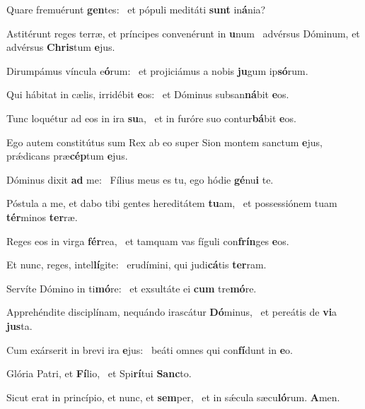 \item Quare fremuérunt \textbf{gen}tes:~\psstar{} et pópuli meditáti \textbf{sunt} in\textbf{á}nia?
\item Astitérunt reges terræ, et príncipes convenérunt in \textbf{u}num~\psstar{} advérsus Dóminum, et advérsus \textbf{Chris}tum \textbf{e}jus.
\item Dirumpámus víncula e\textbf{ó}rum:~\psstar{} et projiciámus a nobis \textbf{ju}gum ip\textbf{só}rum.
\item Qui hábitat in cælis, irridébit \textbf{e}os:~\psstar{} et Dóminus subsan\textbf{ná}bit \textbf{e}os.
\item Tunc loquétur ad eos in ira \textbf{su}a,~\psstar{} et in furóre suo contur\textbf{bá}bit \textbf{e}os.
\item Ego autem constitútus sum Rex ab eo super Sion montem sanctum \textbf{e}jus,~\psstar{} prǽdicans præ\textbf{cép}tum \textbf{e}jus.
\item Dóminus dixit \textbf{ad} me:~\psstar{} Fílius meus es tu, ego hódie \textbf{gé}nu\textbf{i} te.
\item Póstula a me, et dabo tibi gentes hereditátem \textbf{tu}am,~\psstar{} et possessiónem tuam \textbf{tér}minos \textbf{ter}ræ.
\item Reges eos in virga \textbf{fér}rea,~\psstar{} et tamquam vas fíguli con\textbf{frín}ges \textbf{e}os.
\item Et nunc, reges, intel\textbf{lí}gite:~\psstar{} erudímini, qui judi\textbf{cá}tis \textbf{ter}ram.
\item Servíte Dómino in ti\textbf{mó}re:~\psstar{} et exsultáte ei \textbf{cum} tre\textbf{mó}re.
\item Apprehéndite disciplínam, nequándo irascátur \textbf{Dó}minus,~\psstar{} et pereátis de \textbf{vi}a \textbf{jus}ta.
\item Cum exárserit in brevi ira \textbf{e}jus:~\psstar{} beáti omnes qui con\textbf{fí}dunt in \textbf{e}o.
\item Glória Patri, et \textbf{Fí}lio,~\psstar{} et Spi\textbf{rí}tui \textbf{Sanc}to.
\item Sicut erat in princípio, et nunc, et \textbf{sem}per,~\psstar{} et in sǽcula sæcu\textbf{ló}rum. \textbf{A}men.
